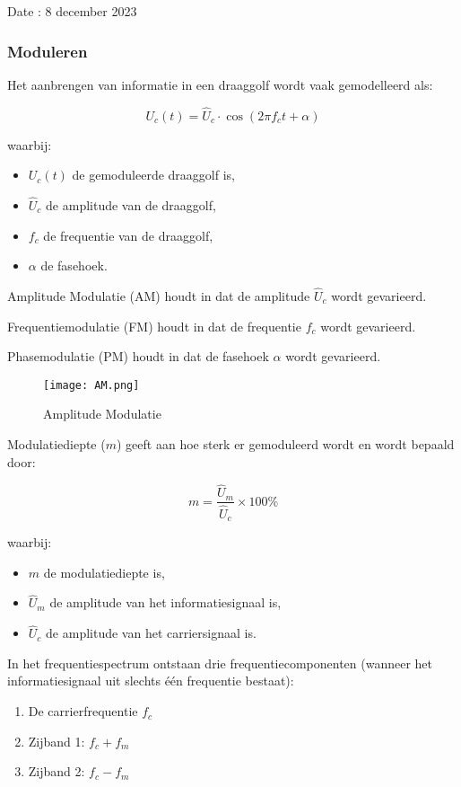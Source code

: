 Date : 8 december 2023

\subsubsection{Moduleren}
Het aanbrengen van informatie in een draaggolf wordt vaak gemodelleerd als:

\[ U_c(t) = \hat{U}_c \cdot \cos(2\pi f_c t + \alpha) \]

waarbij:
\begin{itemize}
  \item \(U_c(t)\) de gemoduleerde draaggolf is,
  \item \(\hat{U}_c\) de amplitude van de draaggolf,
  \item \(f_c\) de frequentie van de draaggolf,
  \item \(\alpha\) de fasehoek.
\end{itemize}

Amplitude Modulatie (AM) houdt in dat de amplitude \(\hat{U}_c\) wordt gevarieerd.

Frequentiemodulatie (FM) houdt in dat de frequentie \(f_c\) wordt gevarieerd.

Phasemodulatie (PM) houdt in dat de fasehoek \(\alpha\) wordt gevarieerd.

\begin{figure}[H]
\centering
\texttt{[image: AM.png]}
\caption{Amplitude Modulatie}
\end{figure}

Modulatiediepte (\(m\)) geeft aan hoe sterk er gemoduleerd wordt en wordt bepaald door:

\[ m = \frac{\hat{U}_m}{\hat{U}_c} \times 100\% \]

waarbij:
\begin{itemize}
  \item \(m\) de modulatiediepte is,
  \item \(\hat{U}_m\) de amplitude van het informatiesignaal is,
  \item \(\hat{U}_c\) de amplitude van het carriersignaal is.
\end{itemize}

In het frequentiespectrum ontstaan drie frequentiecomponenten (wanneer het informatiesignaal uit slechts één frequentie bestaat):

\begin{enumerate}
  \item De carrierfrequentie \(f_c\)
  \item Zijband 1: \(f_c + f_m\)
  \item Zijband 2: \(f_c - f_m\)
\end{enumerate}


